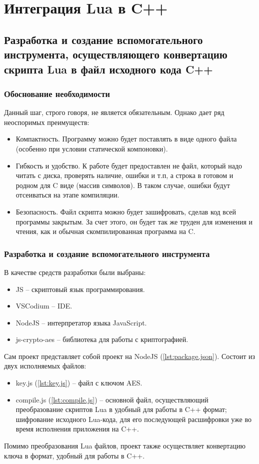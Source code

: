 \section{Интеграция Lua в C++}

\subsection{Разработка и создание вспомогательного инструмента, осуществляющего конвертацию скрипта Lua в файл исходного кода C++}
\subsubsection{Обоснование необходимости}
Данный шаг, строго говоря, не является обязательным. Однако дает ряд неоспоримых преимуществ:
\begin{itemize}
	\item Компактность. Программу можно будет поставлять в виде одного файла (особенно при условии статической компоновки).
	\item Гибкость и удобство. К работе будет предоставлен не файл, который надо читать с диска, проверять наличие, ошибки и т.п, а строка в готовом и родном для C виде (массив символов). В таком случае, ошибки будут отсеиваться на этапе компиляции.
	\item Безопасность. Файл скрипта можно будет зашифровать, сделав код всей программы закрытым. За счет этого, он будет так же труден для изменения и чтения, как и обычная скомпилированная программа на C.
\end{itemize}

\subsubsection{Разработка и создание вспомогательного инструмента}
В качестве средств разработки были выбраны:
\begin{itemize}
	\item JS -- скриптовый язык программирования.
	\item VSCodium -- IDE.
	\item NodeJS -- интерпретатор языка JavaScript.
	\item js-crypto-aes -- библиотека для работы с криптографией.
\end{itemize}
Сам проект представляет собой проект на NodeJS (\autoref{lst:package.json}). Состоит из двух исполняемых файлов:
\begin{itemize}
	\item key.js (\autoref{lst:key.js}) -- файл с ключом AES.
	\item compile.js (\autoref{lst:compile.js}) -- основной файл, осуществляющий преобразование скриптов Lua в удобный для работы в C++ формат; шифрование исходного Lua-кода, для его последующей расшифровки уже во время исполнения приложения на C++.
\end{itemize}
Помимо преобразования Lua файлов, проект также осуществляет конвертацию ключа в формат, удобный для работы в C++.


